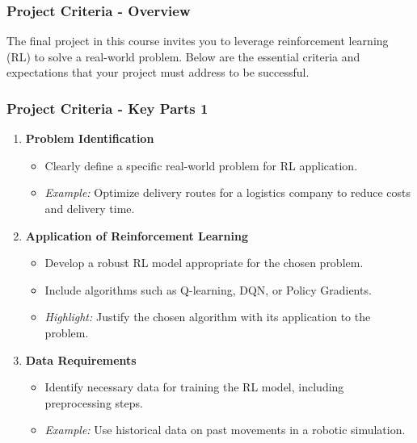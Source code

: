 \documentclass[aspectratio=169]{beamer}
\begin{document}
\begin{frame}[fragile]
    \frametitle{Project Criteria - Overview}
    The final project in this course invites you to leverage reinforcement learning (RL) to solve a real-world problem. Below are the essential criteria and expectations that your project must address to be successful.
\end{frame}

\begin{frame}[fragile]
    \frametitle{Project Criteria - Key Parts 1}
    \begin{enumerate}
        \item \textbf{Problem Identification}
        \begin{itemize}
            \item Clearly define a specific real-world problem for RL application.
            \item \textit{Example:} Optimize delivery routes for a logistics company to reduce costs and delivery time.
        \end{itemize}

        \item \textbf{Application of Reinforcement Learning}
        \begin{itemize}
            \item Develop a robust RL model appropriate for the chosen problem.
            \item Include algorithms such as Q-learning, DQN, or Policy Gradients.
            \item \textit{Highlight:} Justify the chosen algorithm with its application to the problem.
        \end{itemize}

        \item \textbf{Data Requirements}
        \begin{itemize}
            \item Identify necessary data for training the RL model, including preprocessing steps.
            \item \textit{Example:} Use historical data on past movements in a robotic simulation.
        \end{itemize}
    \end{enumerate}
\end{frame}
\end{document}
